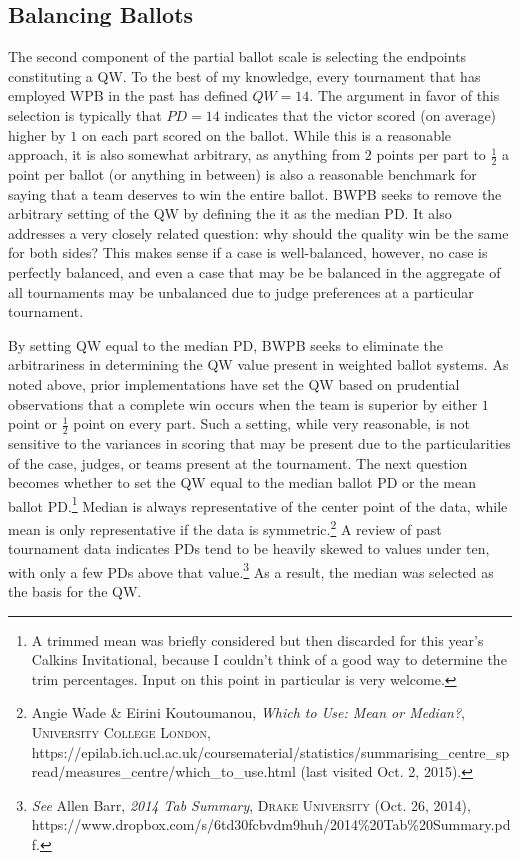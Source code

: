 \documentclass{article}
\begin{document}
\subsection{Balancing Ballots}
\label{balancingBallots}
The second component of the partial ballot scale is selecting the endpoints constituting a QW.  To the best of my knowledge, every tournament that has employed WPB in the past has defined $QW=14$.  The argument in favor of this selection is typically that $PD=14$ indicates that the victor scored (on average) higher by $1$ on each part scored on the ballot.  While this is a reasonable approach, it is also somewhat arbitrary, as anything from $2$ points per part to $\frac{1}{2}$ a point per ballot (or anything in between) is also a reasonable benchmark for saying that a team deserves to win the entire ballot. BWPB seeks to remove the arbitrary setting of the QW by defining the it as the median PD. It also addresses a very closely related question:  why should the quality win be the same for both sides?  This makes sense if a case is well-balanced, however, no case is perfectly balanced, and even a case that may be be balanced in the aggregate of all tournaments may be unbalanced due to judge preferences at a particular tournament.

By setting QW equal to the median PD, BWPB seeks to eliminate the arbitrariness in determining the QW value present in weighted ballot systems. As noted above, prior implementations have set the QW based on prudential observations that a complete win occurs when the team is superior by either $1$ point or $\frac{1}{2}$ point on every part. Such a setting, while very reasonable, is not sensitive to the variances in scoring that may be present due to the particularities of the case, judges, or teams present at the tournament. The next question becomes whether to set the QW equal to the median ballot PD or the mean ballot PD.\footnote{A trimmed mean was briefly considered but then discarded for this year's Calkins Invitational, because I couldn't think of a good way to determine the trim percentages. Input on this point in particular is very welcome.} Median is always representative of the center point of the data, while mean is only representative if the data is symmetric.\footnote{Angie Wade \& Eirini Koutoumanou, \textit{Which to Use: Mean or Median?}, \textsc{University College London}, https://epilab.ich.ucl.ac.uk/coursematerial/statistics/summarising\_centre\_spread/measures\_centre/which\_to\_use.html (last visited Oct. 2, 2015).} A review of past tournament data indicates PDs tend to be heavily skewed to values under ten, with only a few PDs above that value.\footnote{\textit{See} Allen Barr, \textit{2014 Tab Summary}, \textsc{Drake University} (Oct. 26, 2014), https://www.dropbox.com/s/6td30fcbvdm9huh/2014\%20Tab\%20Summary.pdf.} As a result, the median was selected as the basis for the QW.
\end{document}
